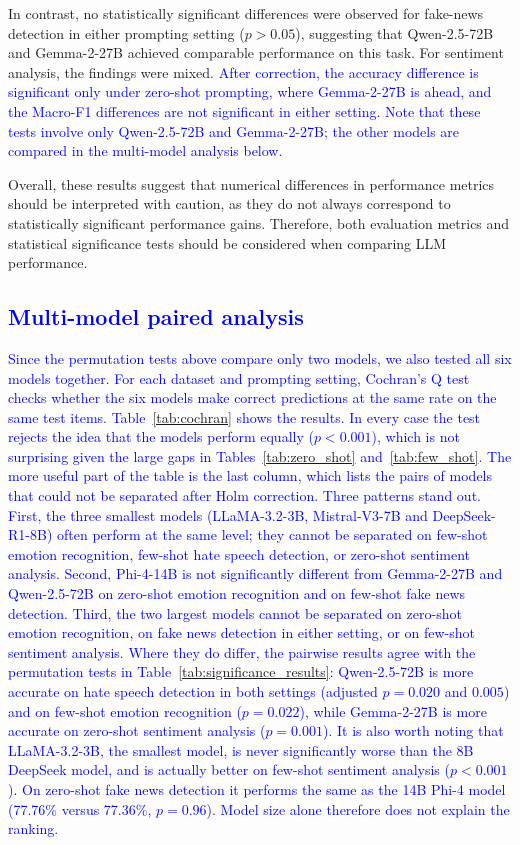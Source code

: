 \documentclass[10pt,letterpaper]{article}
\newcommand{\rev}[1]{\textcolor{blue}{#1}}
\begin{document}
In contrast, no statistically significant differences were observed for fake-news detection in either prompting setting ($p > 0.05$), suggesting that Qwen-2.5-72B and Gemma-2-27B achieved comparable performance on this task. For sentiment analysis, the findings were mixed. \rev{After correction, the accuracy difference is significant only under zero-shot prompting, where Gemma-2-27B is ahead, and the Macro-F1 differences are not significant in either setting. Note that these tests involve only Qwen-2.5-72B and Gemma-2-27B; the other models are compared in the multi-model analysis below.}

Overall, these results suggest that numerical differences in performance metrics should be interpreted with caution, as they do not always correspond to statistically significant performance gains. Therefore, both evaluation metrics and statistical significance tests should be considered when comparing LLM performance.

\rev{\subsection*{Multi-model paired analysis}}

\rev{Since the permutation tests above compare only two models, we also tested all six models together. For each dataset and prompting setting, Cochran's Q test checks whether the six models make correct predictions at the same rate on the same test items. Table~\ref{tab:cochran} shows the results. In every case the test rejects the idea that the models perform equally ($p < 0.001$), which is not surprising given the large gaps in Tables~\ref{tab:zero_shot} and~\ref{tab:few_shot}. The more useful part of the table is the last column, which lists the pairs of models that could not be separated after Holm correction. Three patterns stand out. First, the three smallest models (LLaMA-3.2-3B, Mistral-V3-7B and DeepSeek-R1-8B) often perform at the same level; they cannot be separated on few-shot emotion recognition, few-shot hate speech detection, or zero-shot sentiment analysis. Second, Phi-4-14B is not significantly different from Gemma-2-27B and Qwen-2.5-72B on zero-shot emotion recognition and on few-shot fake news detection. Third, the two largest models cannot be separated on zero-shot emotion recognition, on fake news detection in either setting, or on few-shot sentiment analysis. Where they do differ, the pairwise results agree with the permutation tests in Table~\ref{tab:significance_results}: Qwen-2.5-72B is more accurate on hate speech detection in both settings (adjusted $p = 0.020$ and $0.005$) and on few-shot emotion recognition ($p = 0.022$), while Gemma-2-27B is more accurate on zero-shot sentiment analysis ($p = 0.001$). It is also worth noting that LLaMA-3.2-3B, the smallest model, is never significantly worse than the 8B DeepSeek model, and is actually better on few-shot sentiment analysis ($p < 0.001$). On zero-shot fake news detection it performs the same as the 14B Phi-4 model (77.76\% versus 77.36\%, $p = 0.96$). Model size alone therefore does not explain the ranking.}
\end{document}
